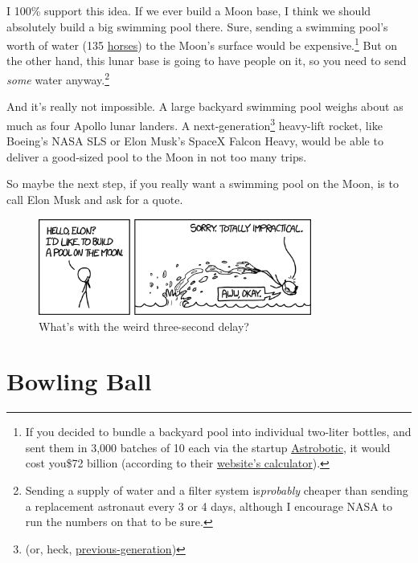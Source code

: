 {{I 100\% support this idea. If we ever build a Moon base, I think we should absolutely build a big swimming pool there. Sure, sending a swimming pool's worth of water (135 \href{http://xkcd.com/1461/}{horses}) to the Moon's surface would be expensive.{\footnote{If you decided to bundle a backyard pool into individual two-liter bottles, and sent them in 3,000 batches of 10 each via the startup \href{https://www.astrobotic.com/}{Astrobotic}, it would cost you\$72 billion (according to their \href{https://www.astrobotic.com/configure-mission}{website's calculator}).} } But on the other hand, this lunar base is going to have people on it, so you need to send \emph{some} water anyway.{\footnote{Sending a supply of water and a filter system is\emph{probably} cheaper than sending a replacement astronaut every 3 or 4 days, although I encourage NASA to run the numbers on that to be sure.} } }

{And it's really not impossible. A large backyard swimming pool weighs about as much as four Apollo lunar landers. A next-generation{\footnote{(or, heck, \href{http://en.wikipedia.org/wiki/Saturn\_V}{previous-generation})} } heavy-lift rocket, like Boeing's NASA SLS or Elon Musk's SpaceX Falcon Heavy, would be able to deliver a good-sized pool to the Moon in not too many trips.}

{So maybe the next step, if you really want a swimming pool on the Moon, is to call Elon Musk and ask for a quote.}

\begin{figure}[!htbp]
\centering
\includegraphics[scale=0.5, max width=0.8\textwidth]{imgs/a/124/elon.png}
\caption{What's with the weird three-second delay?}
\end{figure}

{
\chapter{Bowling Ball}
}

}
